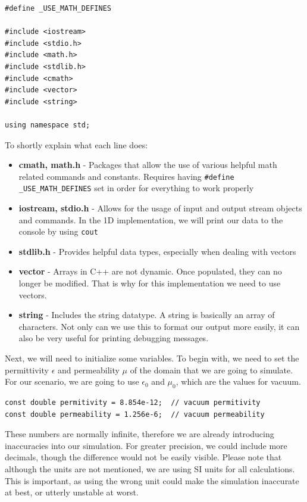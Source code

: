 \begin{verbatim}
#define _USE_MATH_DEFINES
	
#include <iostream>
#include <stdio.h>
#include <math.h>
#include <stdlib.h>
#include <cmath>
#include <vector>
#include <string>

using namespace std;
\end{verbatim}

To shortly explain what each line does:

\begin{itemize}
	\item \textbf{cmath, math.h} - Packages that allow the use of various helpful math related commands and constants. Requires having \space \verb!#define _USE_MATH_DEFINES! set in order for everything to work properly
	\item \textbf{iostream, stdio.h} - Allows for the usage of input and output stream objects and commands. In the 1D implementation, we will print our data to the console by using \verb!cout!
	\item \textbf{stdlib.h} - Provides helpful data types, especially when dealing with vectors
	\item \textbf{vector} - Arrays in C++ are not dynamic. Once populated, they can no longer be modified. That is why for this implementation we need to use vectors.
	\item \textbf{string} - Includes the string datatype. A string is basically an array of characters. Not only can we use this to format our output more easily, it can also be very useful for printing debugging messages.
\end{itemize}

Next, we will need to initialize some variables. To begin with, we need to set the permittivity $\epsilon$ and permeability $\mu$ of the domain that we are going to simulate. For our scenario, we are going to use $\epsilon_{0}$ and $\mu_{0}$, which are the values for vacuum.

\begin{verbatim}
const double permitivity = 8.854e-12;  // vacuum permitivity
const double permeability = 1.256e-6;  // vacuum permeability
\end{verbatim}

These numbers are normally infinite, therefore we are already introducing inaccuracies into our simulation. For greater precision, we could include more decimals, though the difference would not be easily visible. Please note that although the units are not mentioned, we are using SI units for all calculations. This is important, as using the wrong unit could make the simulation inaccurate at best, or utterly unstable at worst.

